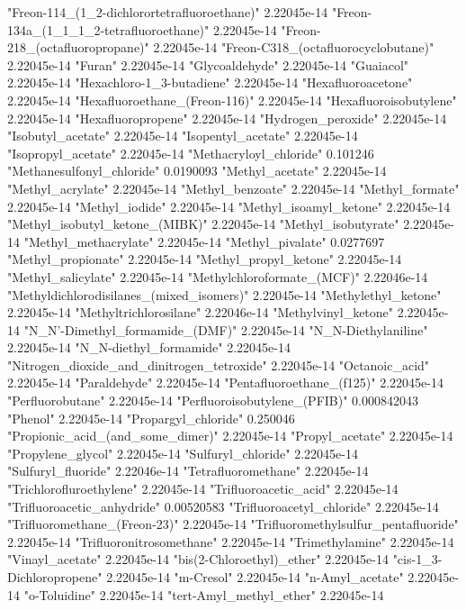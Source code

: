 "Freon-114_(1_2-dichlorortetrafluoroethane)"	2.22045e-14
"Freon-134a_(1_1_1_2-tetrafluoroethane)"	2.22045e-14
"Freon-218_(octafluoropropane)"	2.22045e-14
"Freon-C318_(octafluorocyclobutane)"	2.22045e-14
"Furan"	2.22045e-14
"Glycoaldehyde"	2.22045e-14
"Guaiacol"	2.22045e-14
"Hexachloro-1_3-butadiene"	2.22045e-14
"Hexafluoroacetone"	2.22045e-14
"Hexafluoroethane_(Freon-116)"	2.22045e-14
"Hexafluoroisobutylene"	2.22045e-14
"Hexafluoropropene"	2.22045e-14
"Hydrogen_peroxide"	2.22045e-14
"Isobutyl_acetate"	2.22045e-14
"Isopentyl_acetate"	2.22045e-14
"Isopropyl_acetate"	2.22045e-14
"Methacryloyl_chloride"	0.101246
"Methanesulfonyl_chloride"	0.0190093
"Methyl_acetate"	2.22045e-14
"Methyl_acrylate"	2.22045e-14
"Methyl_benzoate"	2.22045e-14
"Methyl_formate"	2.22045e-14
"Methyl_iodide"	2.22045e-14
"Methyl_isoamyl_ketone"	2.22045e-14
"Methyl_isobutyl_ketone_(MIBK)"	2.22045e-14
"Methyl_isobutyrate"	2.22045e-14
"Methyl_methacrylate"	2.22045e-14
"Methyl_pivalate"	0.0277697
"Methyl_propionate"	2.22045e-14
"Methyl_propyl_ketone"	2.22045e-14
"Methyl_salicylate"	2.22045e-14
"Methylchloroformate_(MCF)"	2.22046e-14
"Methyldichlorodisilanes_(mixed_isomers)"	2.22045e-14
"Methylethyl_ketone"	2.22045e-14
"Methyltrichlorosilane"	2.22046e-14
"Methylvinyl_ketone"	2.22045e-14
"N_N'-Dimethyl_formamide_(DMF)"	2.22045e-14
"N_N-Diethylaniline"	2.22045e-14
"N_N-diethyl_formamide"	2.22045e-14
"Nitrogen_dioxide_and_dinitrogen_tetroxide"	2.22045e-14
"Octanoic_acid"	2.22045e-14
"Paraldehyde"	2.22045e-14
"Pentafluoroethane_(f125)"	2.22045e-14
"Perfluorobutane"	2.22045e-14
"Perfluoroisobutylene_(PFIB)"	0.000842043
"Phenol"	2.22045e-14
"Propargyl_chloride"	0.250046
"Propionic_acid_(and_some_dimer)"	2.22045e-14
"Propyl_acetate"	2.22045e-14
"Propylene_glycol"	2.22045e-14
"Sulfuryl_chloride"	2.22045e-14
"Sulfuryl_fluoride"	2.22046e-14
"Tetrafluoromethane"	2.22045e-14
"Trichlorofluroethylene"	2.22045e-14
"Trifluoroacetic_acid"	2.22045e-14
"Trifluoroacetic_anhydride"	0.00520583
"Trifluoroacetyl_chloride"	2.22045e-14
"Trifluoromethane_(Freon-23)"	2.22045e-14
"Trifluoromethylsulfur_pentafluoride"	2.22045e-14
"Trifluoronitrosomethane"	2.22045e-14
"Trimethylamine"	2.22045e-14
"Vinayl_acetate"	2.22045e-14
"bis(2-Chloroethyl)_ether"	2.22045e-14
"cis-1_3-Dichloropropene"	2.22045e-14
"m-Cresol"	2.22045e-14
"n-Amyl_acetate"	2.22045e-14
"o-Toluidine"	2.22045e-14
"tert-Amyl_methyl_ether"	2.22045e-14
